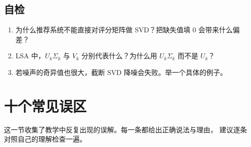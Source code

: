 \documentclass[UTF8, 11pt, a4paper, fontset=windows]{ctexart}
\theoremstyle{cnthm}
\theoremstyle{cndef}
\begin{document}
\subsection*{自检}
\begin{enumerate}
  \item 为什么推荐系统不能直接对评分矩阵做 SVD？把缺失值填 $0$ 会带来什么偏差？
  \item LSA 中，$U_k\Sigma_k$ 与 $V_k$ 分别代表什么？为什么用 $U_k\Sigma_k$ 而不是 $U_k$？
  \item 若噪声的奇异值也很大，截断 SVD 降噪会失败。举一个具体的例子。
\end{enumerate}

\section{十个常见误区}\label{sec:pitfall}

这一节收集了教学中反复出现的误解。每一条都给出正确说法与理由，
建议逐条对照自己的理解检查一遍。
\end{document}
